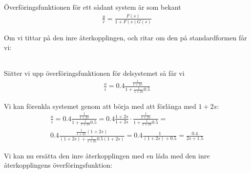 \documentclass[a4paper]{article}
\begin{document}
Överföringsfunktionen för ett sådant system är som bekant
\begin{align*}
  \frac{y}{r} = \frac{F(s)}{1 + F(s)G(s)}
\end{align*}


Om vi tittar på den inre återkopplingen, och ritar om den på standardformen får vi:\\

\\


Sätter vi upp överföringsfunktionen för delsystemet så får vi
\begin{align*}
  \frac{o}{i} = 0.4 \frac{\frac{1}{1+2s}}{1+\frac{1}{1+2s}0.5}
\end{align*}

Vi kan förenkla systemet genom att börja med att förlänga med $1+2s$:
\begin{align*}
  \frac{o}{i} = 0.4 \frac{\frac{1}{1+2s}}{1+\frac{1}{1+2s}0.5} = 0.4 \frac{1+2s}{1+2s} \cdot \frac{\frac{1}{1+2s}}{1+\frac{1}{1+2s}0.5} =\\
  0.4 \frac{\frac{1}{1+2s}(1+2s)}{(1+2s) + \frac{1}{1+2s}0.5(1+2s)} = 0.4 \frac{1}{(1+2s) + 0.5} = \frac{0.4}{2s + 1.5}
\end{align*}


Vi kan nu ersätta den inre återkopplingen med en låda med den inre återkopp\-lingens överföringsfunktion:\\
\end{document}
